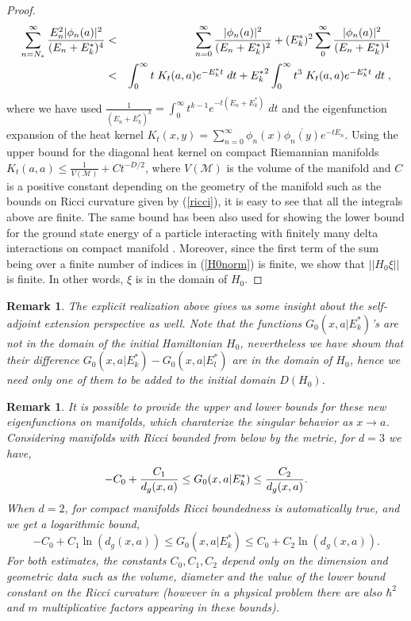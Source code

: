 \documentclass[amsmath,amssymb,14pt]{article}
\numberwithin{equation}{section}
\newtheorem{myremark}[mytheo]{Remark}
\begin{document}
\begin{proof}
%
\begin{eqnarray}
    \sum_{n={N_*}}^\infty {E_n^2 |\phi_n(a)|^2\over (E_n+E_k^*)^4}&<&\sum_{n=0}^\infty { |\phi_n(a)|^2\over (E_n+E_k^*)^2}+(E_k^*)^2\sum_{0}^\infty { |\phi_n(a)|^2\over (E_n+E_k^*)^4}\nonumber\\
    &<& \int_0^\infty t \; K_t(a,a) e^{-{E_k^*}t} \; d t +{E_k^*}^2\int^\infty_0 t^3 \; K_t(a,a) e^{-{E_k^*}t} \; d t \;,
\end{eqnarray}
%
where we have used $\frac{1}{(E_n+E_{k}^*)^k} = \int_{0}^{\infty} t^{k-1} e^{-t(E_n + E_{k}^{*})} \; dt$ and the eigenfunction expansion of the heat kernel $K_t(x,y)= \sum_{n=0}^{\infty} \phi_n(x) \overline{\phi_n(y)} e^{-tE_{n}}$. Using the upper bound for the diagonal heat kernel on compact Riemannian manifolds $K_t(a,a) \leq \frac{1}{V(\mathcal{M})} + C t^{-D/2}$, where $V(\mathcal{M})$ is the volume of the manifold and $C$ is a positive constant depending on the geometry of the manifold such as the bounds on Ricci curvature given by (\ref{ricci}), it is easy to see that all the integrals above are finite. The same bound has been also used for showing the lower bound for the ground state energy of a particle interacting with finitely many delta interactions on compact manifold \cite{ErmanTurgut}. Moreover, since the first term of the sum being over a finite number of indices in (\ref{H0norm}) is finite, we show that $||H_0 \xi ||$ is finite. In other words, $\xi$ is in the domain of $H_0$.  
\end{proof}


\begin{myremark}
The explicit realization above gives us some insight about the self-adjoint extension perspective as well. Note that the 
functions $G_0(x, a|E_k^*)$'s are not in the domain of the initial Hamiltonian $H_0$, nevertheless we have shown that their difference $G_0(x, a|E_k^*)-G_0(x,a|E_l^*)$ are in the domain 
of $H_0$, hence we need only one of them to be added to the initial domain $D(H_0)$.
\end{myremark}

\begin{myremark}
It is possible to provide the upper and lower bounds for  these new eigenfunctions on manifolds, which charaterize the singular behavior as $x\to a$. Considering manifolds with Ricci bounded from below by the metric,  for $d=3$ we have,
$$
-C_0+{C_1\over d_g(x,a)}\leq G_0(x,a|E_k^*)\leq {C_2\over d_g(x,a)}.
$$
When $d=2$, for compact manifolds Ricci boundedness is automatically true, and we get a logarithmic bound,
$$
-C_0+C_1\ln(d_g(x,a))\leq G_0(x,a|E_k^*)\leq C_0+C_2\ln(d_g(x,a)).
$$
For both estimates, the constants $C_0, C_1, C_2$ depend only on the  dimension and geometric data such as the volume, diameter and the value of the lower bound constant on the Ricci curvature (however in a physical problem there are also $\hbar^2$ and $m$ multiplicative factors appearing in these bounds). \end{myremark}
\end{document}
